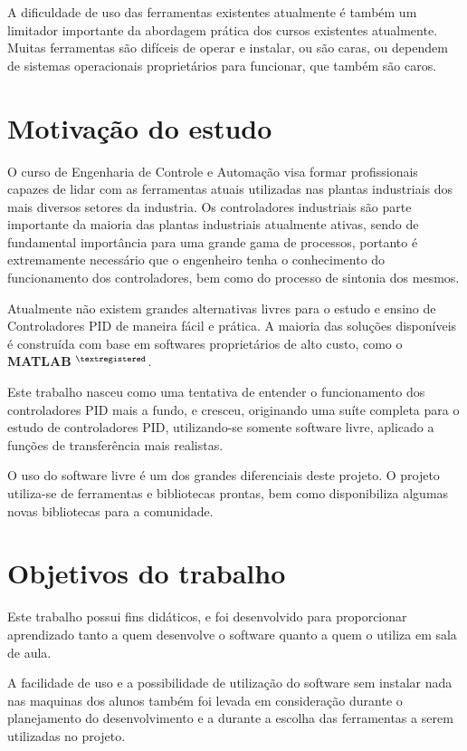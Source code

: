     A dificuldade de uso das ferramentas existentes atualmente é também um limitador
    importante da abordagem prática dos cursos existentes atualmente. Muitas ferramentas
    são difíceis de operar e instalar, ou são caras, ou dependem de sistemas operacionais
    proprietários para funcionar, que também são caros.

\section{Motivação do estudo}

    O curso de Engenharia de Controle e Automação visa formar profissionais
    capazes de lidar com as ferramentas atuais utilizadas nas plantas industriais
    dos mais diversos setores da industria. Os controladores industriais são
    parte importante da maioria das plantas industriais atualmente ativas,
    sendo de fundamental importância para uma grande gama de processos, portanto
    é extremamente necessário que o engenheiro tenha o conhecimento do funcionamento
    dos controladores, bem como do processo de sintonia dos mesmos.
    
    Atualmente não existem grandes alternativas livres para o estudo e ensino
    de Controladores PID de maneira fácil e prática. A maioria das soluções
    disponíveis é construída com base em softwares proprietários de alto custo,
    como o \textbf{MATLAB} $^{\textregistered}$.
    
    Este trabalho nasceu como uma tentativa de entender o funcionamento dos
    controladores PID mais a fundo, e cresceu, originando uma suíte completa
    para o estudo de controladores PID, utilizando-se somente software livre,
    aplicado a funções de transferência mais realistas.

    O uso do software livre é um dos grandes diferenciais deste projeto. O projeto
    utiliza-se de ferramentas e bibliotecas prontas, bem como disponibiliza algumas
    novas bibliotecas para a comunidade.

\section{Objetivos do trabalho}

    Este trabalho possui fins didáticos, e foi desenvolvido para proporcionar
    aprendizado tanto a quem desenvolve o software quanto a quem o utiliza em sala
    de aula.
    
    A facilidade de uso e a possibilidade de utilização do software sem instalar
    nada nas maquinas dos alunos também foi levada em consideração durante o
    planejamento do desenvolvimento e a durante a escolha das ferramentas a serem
    utilizadas no projeto.
    
